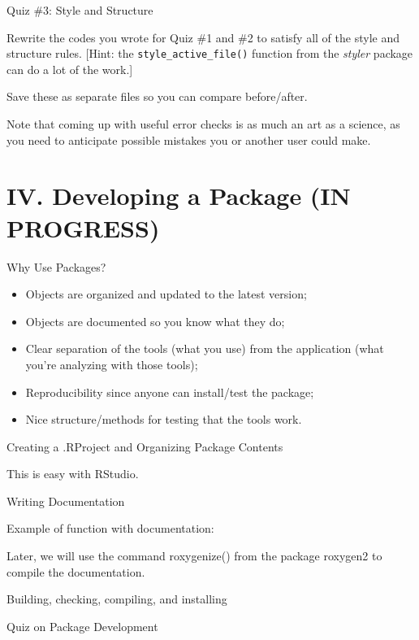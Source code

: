 \documentclass[10pt,ignorenonframetext,]{beamer}
\begin{document}
\begin{frame}[fragile]{Quiz \#3: Style and Structure}

Rewrite the codes you wrote for Quiz \#1 and \#2 to satisfy all of the
style and structure rules. {[}Hint: the \texttt{style\_active\_file()}
function from the \emph{styler} package can do a lot of the work.{]}

Save these as separate files so you can compare before/after.

Note that coming up with useful error checks is as much an art as a
science, as you need to anticipate possible mistakes you or another user
could make.

\end{frame}

\section{IV. Developing a Package (IN
PROGRESS)}\label{iv.-developing-a-package-in-progress}

\begin{frame}{Why Use Packages?}

\begin{itemize}
\item
  Objects are organized and updated to the latest version;
\item
  Objects are documented so you know what they do;
\item
  Clear separation of the tools (what you use) from the application
  (what you're analyzing with those tools);
\item
  Reproducibility since anyone can install/test the package;
\item
  Nice structure/methods for testing that the tools work.
\end{itemize}

\end{frame}

\begin{frame}{Creating a .RProject and Organizing Package Contents}

This is easy with RStudio.

\end{frame}

\begin{frame}{Writing Documentation}

Example of function with documentation:

Later, we will use the command roxygenize() from the package roxygen2 to
compile the documentation.

\end{frame}

\begin{frame}{Building, checking, compiling, and installing}

\end{frame}

\begin{frame}{Quiz on Package Development}

\end{frame}
\end{document}
